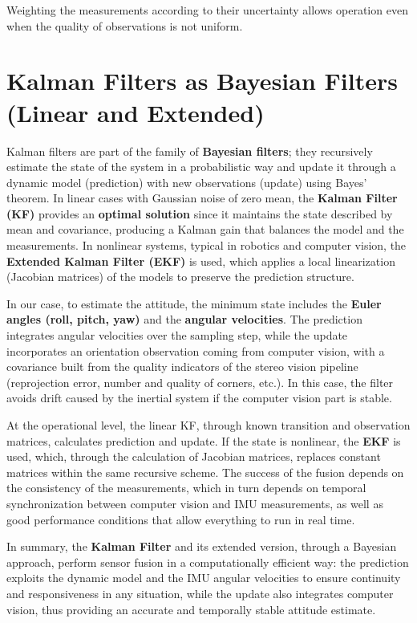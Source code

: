 Weighting the measurements according to their uncertainty allows operation even when the quality of observations is not uniform.

\section[Kalman Filters as Bayesian Filters]{Kalman Filters as Bayesian Filters (Linear and Extended)}

Kalman filters are part of the family of \textbf{Bayesian filters}; they recursively estimate the state of the system in a probabilistic way and update it through a dynamic model (prediction) with new observations (update) using Bayes’ theorem. In linear cases with Gaussian noise of zero mean, the \textbf{Kalman Filter (KF)} provides an \textbf{optimal solution} since it maintains the state described by mean and covariance, producing a Kalman gain that balances the model and the measurements. In nonlinear systems, typical in robotics and computer vision, the \textbf{Extended Kalman Filter (EKF)} is used, which applies a local linearization (Jacobian matrices) of the models to preserve the prediction structure.

In our case, to estimate the attitude, the minimum state includes the \textbf{Euler angles (roll, pitch, yaw)} and the \textbf{angular velocities}. The prediction integrates angular velocities over the sampling step, while the update incorporates an orientation observation coming from computer vision, with a covariance built from the quality indicators of the stereo vision pipeline (reprojection error, number and quality of corners, etc.). In this case, the filter avoids drift caused by the inertial system if the computer vision part is stable.

At the operational level, the linear KF, through known transition and observation matrices, calculates prediction and update. If the state is nonlinear, the \textbf{EKF} is used, which, through the calculation of Jacobian matrices, replaces constant matrices within the same recursive scheme. The success of the fusion depends on the consistency of the measurements, which in turn depends on temporal synchronization between computer vision and IMU measurements, as well as good performance conditions that allow everything to run in real time.

In summary, the \textbf{Kalman Filter} and its extended version, through a Bayesian approach, perform sensor fusion in a computationally efficient way: the prediction exploits the dynamic model and the IMU angular velocities to ensure continuity and responsiveness in any situation, while the update also integrates computer vision, thus providing an accurate and temporally stable attitude estimate.
